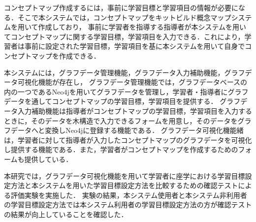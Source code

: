 \begin{titlepage}
    コンセプトマップ作成するには，事前に学習目標と学習項目の情報が必要になる．そこで本システムでは，コンセプトマップをキットビルド概念マップシステム\cite{kit}\cite{kit2}を用いて作成しており，
    事前に学習者を指導する指導者が本システムを用いてコンセプトマップに関する学習目標，学習項目を入力できる．これにより，学習者は事前に設定された学習目標，学習項目を基に本システムを用いて自身でコンセプトマップを作成できる．

    本システムには，グラフデータ管理機能，グラフデータ入力補助機能，グラフデータ可視化機能が存在し，
    グラフデータ管理機能では，グラフデータベースの内の一つであるNeo4jを用いてグラフデータを管理し，学習者・指導者にグラフデータを通してコンセプトマップの学習目標，学習項目を提供する．
    グラフデータ入力補助機能は指導者がコンセプトマップの学習目標，学習項目を入力するときに，そのデータを木構造で入力できるフォームを用意し，そのデータをグラフデータへと変換しNeo4jに登録する機能である．
    グラフデータ可視化機能緒は，学習者に対して指導者が入力したコンセプトマップのグラフデータを可視化し提供する機能である．また，学習者がコンセプトマップを作成するためのフォームも提供している．

    本研究では，グラフデータ可視化機能を用いて学習者に座学における学習目標設定方法と本システムを用いた学習目標設定方法を比較するための確認テストによる評価実験を実施した．
    実験の結果，本システム使用者と本システム非利用者の学習目標設定方法では本システム利用者の学習目標設定方法の方が確認テストの結果が向上していることを確認した．
\end{titlepage}
